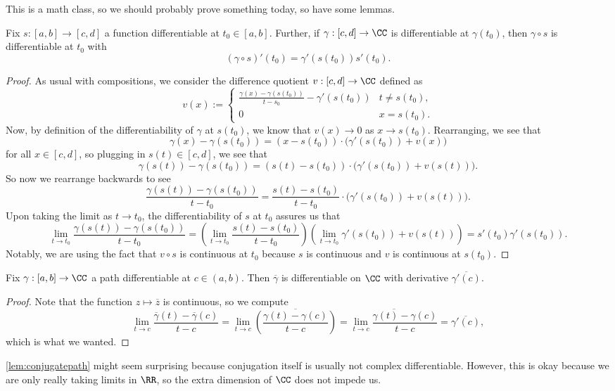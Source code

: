 This is a math class, so we should probably prove something today, so have some lemmas.
\begin{lemma}
	Fix $s:[a,b]\to[c,d]$ a function differentiable at $t_0\in[a,b]$. Further, if $\gamma:[c,d]\to\CC$ is differentiable at $\gamma(t_0)$, then $\gamma\circ s$ is differentiable at $t_0$ with
	\[(\gamma\circ s)'(t_0)=\gamma'(s(t_0))s'(t_0).\]
\end{lemma}
\begin{proof}
	As usual with compositions, we consider the difference quotient $v:[c,d]\to\CC$ defined as
	\[v(x):=\begin{cases}
		\frac{\gamma(x)-\gamma(s(t_0))}{t-s_0}-\gamma'(s(t_0)) & t\ne s(t_0), \\
		0 & x=s(t_0).
	\end{cases}\]
	Now, by definition of the differentiability of $\gamma$ at $s(t_0)$, we know that $v(x)\to0$ as $x\to s(t_0)$. Rearranging, we see that
	\[\gamma(x)-\gamma(s(t_0))=(x-s(t_0))\cdot\big(\gamma'(s(t_0))+v(x)\big)\]
	for all $x\in [c,d]$, so plugging in $s(t)\in[c,d]$, we see that
	\[\gamma(s(t))-\gamma(s(t_0))=(s(t)-s(t_0))\cdot\big(\gamma'(s(t_0))+v(s(t))\big).\]
	So now we rearrange backwards to see
	\[\frac{\gamma(s(t))-\gamma(s(t_0))}{t-t_0}=\frac{s(t)-s(t_0)}{t-t_0}\cdot\big(\gamma'(s(t_0))+v(s(t))\big).\]
	Upon taking the limit as $t\to t_0$, the differentiability of $s$ at $t_0$ assures us that
	\[\lim_{t\to t_0}\frac{\gamma(s(t))-\gamma(s(t_0))}{t-t_0}=\left(\lim_{t\to t_0}\frac{s(t)-s(t_0)}{t-t_0}\right)\left(\lim_{t\to t_0}\gamma'(s(t_0))+v(s(t))\right)=s'(t_0)\gamma'(s(t_0)).\]
	Notably, we are using the fact that $v\circ s$ is continuous at $t_0$ because $s$ is continuous and $v$ is continuous at $s(t_0)$.
\end{proof}
\begin{lemma} \label{lem:conjugatepath}
	Fix $\gamma:[a,b]\to\CC$ a path differentiable at $c\in(a,b)$. Then $\overline{\gamma}$ is differentiable on $\CC$ with derivative $\overline{\gamma'(c)}$.
\end{lemma}
\begin{proof}
	Note that the function $z\mapsto\overline z$ is continuous, so we compute
	\[\lim_{t\to c}\frac{\overline\gamma(t)-\overline\gamma(c)}{t-c}=\lim_{t\to c}\overline{\left(\frac{\gamma(t)-\gamma(c)}{t-c}\right)}=\overline{\lim_{t\to c}\frac{\gamma(t)-\gamma(c)}{t-c}}=\overline{\gamma'(c)},\]
	which is what we wanted.
\end{proof}
\begin{remark}
	\autoref{lem:conjugatepath} might seem surprising because conjugation itself is usually not complex differentiable. However, this is okay because we are only really taking limits in $\RR$, so the extra dimension of $\CC$ does not impede us.
\end{remark}
